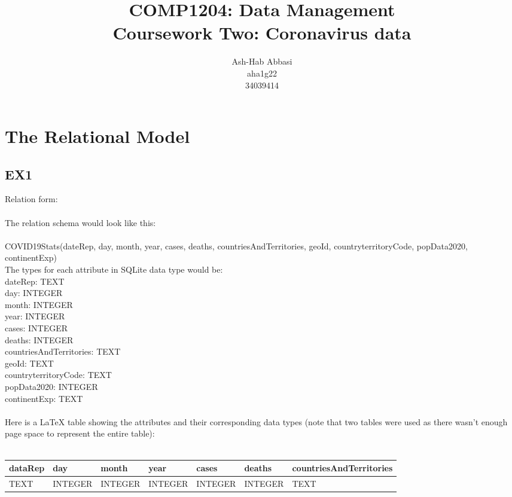 \documentclass[]{article}
\title{COMP1204: Data Management \\ Coursework Two: Coronavirus data }
\author{Ash-Hab Abbasi \\ aha1g22 \\ 34039414}
\begin{document}
\maketitle
\tableofcontents
\pagebreak
\section{The Relational Model}
\subsection{EX1} 

Relation form:\\\\
The relation schema would look like this:\\\\
COVID19Stats(dateRep, day, month, year, cases, deaths, countriesAndTerritories, geoId, countryterritoryCode, popData2020, continentExp)\\
The types for each attribute in SQLite data type would be:\\
dateRep: TEXT\\
    day: INTEGER\\
    month: INTEGER\\
    year: INTEGER\\
    cases: INTEGER\\
    deaths: INTEGER\\
    countriesAndTerritories: TEXT\\
    geoId: TEXT\\
    countryterritoryCode: TEXT\\
    popData2020: INTEGER\\
    continentExp: TEXT\\\\
Here is a LaTeX table showing the attributes and their corresponding data types (note that two tables were used as there wasn't enough page space to represent the entire table):\\
\\
\begin{tabularx}{1\textwidth} { 
  | >{\centering\arraybackslash}X 
  | >{\centering\arraybackslash}X 
  | >{\centering\arraybackslash}X
  | >{\centering\arraybackslash}X
  | >{\centering\arraybackslash}X
  | >{\centering\arraybackslash}X
  | >{\centering\arraybackslash}X| }
 \hline
 dataRep & day & month & year & cases & deaths & countriesAndTerritories  \\
 \hline
 TEXT  & INTEGER  & INTEGER & INTEGER & INTEGER & INTEGER &  TEXT\\
\hline
\end{tabularx}\\\\\\
\end{document}
